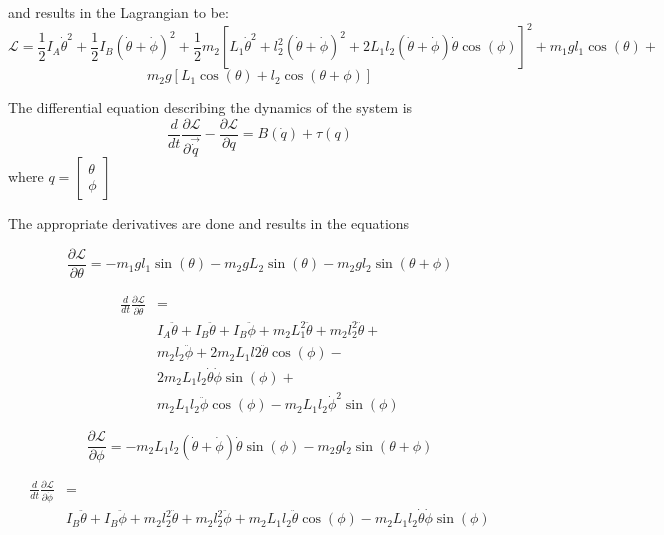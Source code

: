and results in the Lagrangian to be:
$$\mathcal{L} = \frac{1}{2}I_{A}\dot{\theta}^2 + \frac{1}{2}I_{B}(\dot{\theta}+\dot{\phi})^2 + \frac{1}{2}m_{2}[L_{1}\dot{\theta}^2+l_{2}^2(\dot{\theta}+\dot{\phi})^2 + 
2L_{1}l_{2}(\dot{\theta}+\dot{\phi})\dot{\theta}\cos(\phi)]^2+m_{1}gl_{1}\cos(\theta)+$$
$$m_{2}g[L_{1}\cos(\theta)+l_{2}\cos(\theta+\phi)]$$

The differential equation describing the dynamics of the system is
$$\frac{d}{dt}\frac{\partial\mathcal{L}}{\partial\vec{\dot{q}}}-\frac{\partial\mathcal{L}}{\partial q} = B(\dot{q})+\tau(q)$$ 
where  $ q = 
\begin{bmatrix}
\theta \\
\phi
\end{bmatrix}
$

The appropriate derivatives are done and results in the equations 

\begin{equation}
\frac{\partial\mathcal{L}}{\partial\theta} = -m_{1}gl_{1}\sin(\theta)-m_{2}gL_{2}\sin(\theta)-m_{2}gl_{2}\sin(\theta+\phi)
\end{equation}

\begin{equation}
\begin{split}
\frac{d}{dt}\frac{\partial\mathcal{L}}{\partial\dot{\theta}} &=\\ &I_{A}\ddot{\theta}+I_{B}\ddot{\theta}+I_{B}\ddot{\phi}+m_{2}L_{1}^2\ddot{\theta}+m_{2}l_{2}^2\ddot{\theta}+\\
&m_{2}l_{2}\ddot{\phi}+2m_{2}L_{1}l{2}\ddot{\theta}\cos(\phi)-\\
&2m_{2}L_{1}l_{2}\dot{\theta}\dot{\phi}\sin(\phi)+\\
&m_{2}L_{1}l_{2}\ddot{\phi}\cos(\phi)-m_{2}L_{1}l_{2}\dot{\phi}^2\sin(\phi)
\end{split}
\end{equation}


\begin{equation}
\frac{\partial\mathcal{L}}{\partial\phi} = -m_{2}L_{1}l_{2}(\dot{\theta}+\dot{\phi})\dot{\theta}\sin(\phi)-m_{2}gl_{2}\sin(\theta+\phi)
\end{equation}

\begin{equation}
\begin{split}
\frac{d}{dt}\frac{\partial\mathcal{L}}{\partial\dot{\phi}} &= \\
&I_{B}\ddot{\theta}+I_{B}\ddot{\phi}+m_{2}l_{2}^2\ddot{\theta}+m_{2}l_{2}^2\ddot{\phi}+m_{2}L_{1}l_{2}\ddot{\theta}\cos(\phi)-m_{2}L_{1}l_{2}\dot{\theta}\dot{\phi}\sin(\phi)
\end{split}
\end{equation}

